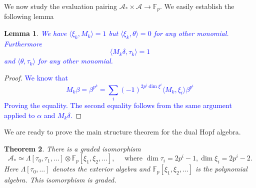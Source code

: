 \documentclass[11pt, a4paper]{article}
\newtheorem{thm}{Theorem}
\newtheorem{lemma}[thm]{Lemma}
\theoremstyle{plain}
\newtheorem*{proof}{Proof}
\begin{document}
We now study the evaluation pairing $\mathcal{A}_\ast\times \mathcal{A} \to \mathbb{F}_p$. We easily establish the following lemma
\begin{lemma}
	\textcolor{blue}{
We have $\langle\xi_k,M_k\rangle=1$ but $\langle \xi_k, \theta\rangle=0 $ for any other monomial.\\
Furthermore
\[ 
\langle M_k \delta, \tau_k \rangle = 1
\]
and $\langle \theta, \tau_k\rangle$ for any other monomial.}
\end{lemma}
\begin{proof}
	\textcolor{blue}{
We know that
\[ 
M_k \beta = \beta^{p^{k}}= \sum_i ( -1)^{2 p^{i}\dim \xi^{i}} \langle M_k, \xi_i\rangle \beta^{p^{i}}
\]
Proving the equality. The second equality follows from the same argument applied to $\alpha$ and $M_k\delta$.}
\end{proof}
We are ready to prove the main structure theorem for the dual Hopf algebra.
\begin{thm}
	There is a graded isomorphism
	\[ 
		\mathcal{A}_\ast \simeq \Lambda [ \tau_0,\tau_1,\ldots] \otimes \mathbb{F}_p[\xi_1,\xi_2,\ldots], \quad \text{ where } \dim \tau_i = 2p^{i}-1 , \dim \xi_i = 2p^{i}-2.
	\]
	Here $\Lambda[\tau_0,\ldots]$ denotes the exterior algebra and $\mathbb{F}_p[\xi_1,\xi_2,\ldots]$ is the polynomial algebra. This isomorphism is graded.
\end{thm}
\end{document}
